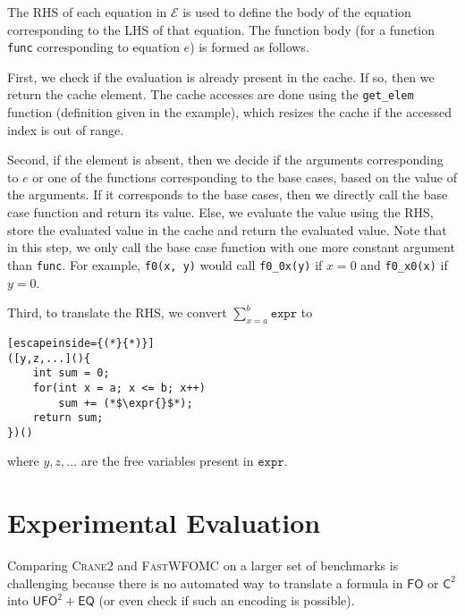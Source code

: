 \documentclass{article}
\theoremstyle{definition}
\newcommand{\expr}{\mathtt{expr}}
\newcommand{\Ctwo}{$\mathsf{C}^{2}$}
\newcommand{\FO}{$\mathsf{FO}$}
\newcommand{\UFO}{$\mathsf{UFO}^{2} + \mathsf{EQ}$}
\newcommand{\Cranetwo}{\textsc{Crane2}}
\begin{document}
The RHS of each equation in $\mathcal{E}$ is used to define the body of the
equation corresponding to the LHS of that equation. The function body (for a
function \texttt{func} corresponding to equation $e$) is formed as follows.

First, we check if the evaluation is already present in the cache. If so, then
we return the cache element. The cache accesses are done using the
\texttt{get\_elem} function (definition given in the example), which resizes the
cache if the accessed index is out of range.

Second, if the element is absent, then we decide if the arguments corresponding
to $e$ or one of the functions corresponding to the base cases, based on the
value of the arguments. If it corresponds to the base cases, then we directly
call the base case function and return its value. Else, we evaluate the value
using the RHS, store the evaluated value in the cache and return the evaluated
value. Note that in this step, we only call the base case function with one more
constant argument than \texttt{func}. For example, \texttt{f0(x, y)} would call
\texttt{f0\_0x(y)} if $x = 0$ and \texttt{f0\_x0(x)} if $y = 0$.

Third, to translate the RHS, we convert $\sum_{x=a}^{b} \expr{}$ to
\begin{lstlisting}[escapeinside={(*}{*)}]
([y,z,...](){
    int sum = 0;
    for(int x = a; x <= b; x++)
        sum += (*$\expr{}$*);
    return sum;
})()
\end{lstlisting}
where $y, z, \dots$ are the free variables present in $\expr{}$.

\section{Experimental Evaluation}

Comparing \Cranetwo{} and \textsc{FastWFOMC} on a larger set of benchmarks is
challenging because there is no automated way to translate a formula in \FO{} or
\Ctwo{} into \UFO{} (or even check if such an encoding is possible).
\end{document}
